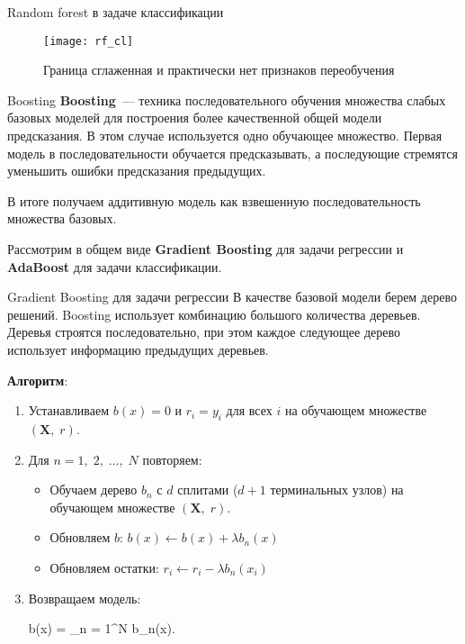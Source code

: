 \documentclass[notheorems, handout]{beamer}
\begin{document}
\begin{frame}{Random forest в задаче классификации}
\begin{figure}[h!]
  \texttt{[image: rf\_cl]}
 \caption{Граница сглаженная и практически нет признаков переобучения}
\end{figure}
\end{frame}

\begin{frame}{Boosting}
\textbf{Boosting}~--- техника последовательного обучения множества слабых базовых моделей для построения более качественной общей модели предсказания. В этом случае используется одно обучающее множество. Первая модель в последовательности обучается предсказывать, а последующие стремятся уменьшить ошибки предсказания предыдущих. 
\par\smallskip
В итоге получаем аддитивную модель как взвешенную последовательность множества базовых.
\par\smallskip
Рассмотрим в общем виде \textbf{Gradient Boosting} для задачи регрессии и \textbf{AdaBoost} для задачи классификации.
\end{frame}

\begin{frame}{Gradient Boosting для задачи регрессии}
В качестве базовой модели берем дерево решений. Boosting использует комбинацию большого количества деревьев. Деревья строятся последовательно, при этом  каждое следующее дерево использует информацию предыдущих деревьев. 
\par\smallskip
\textbf{Алгоритм}:
\begin{enumerate}
	\item Устанавливаем $b(x) = 0$ и $r_{i} = y_{i}$ для всех $i$ на обучающем множестве $(\mathbf{X},\; r)$.
	\item Для $n = 1,\; 2,\; \dots,\; N$ повторяем:
		\begin{itemize}
			\item Обучаем дерево $b_{n}$ с $d$ сплитами ($d + 1$ терминальных узлов) на обучающем множестве $(\mathbf{X},\; r)$.
			\item Обновляем $b$: $b(x) \gets b(x) + \lambda b_{n}(x)$
			\item Обновляем остатки: $r_{i} \gets r_{i} - \lambda b_{n}(x_{i})$
		\end{itemize}
	\item Возвращаем модель:
		\begin{flalign*}
			b(x) = \displaystyle\sum_{n = 1}^{N} \lambda b_{n}(x).
		\end{flalign*}		
\end{enumerate}
\end{frame}
\end{document}

